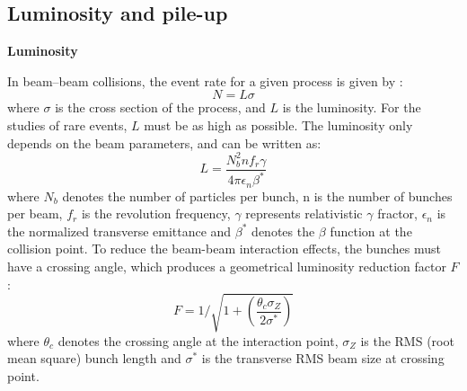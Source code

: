 \subsection{Luminosity and pile-up}

\textbf{Luminosity}

In beam–beam collisions, the event rate for a given process is given by \cite{Evans_2008}:
\begin{equation}
	N = L\sigma
\end{equation}
where $\sigma$ is the cross section of the process, and $L$ is the luminosity.
For the studies of rare events, $L$ must be as high as possible.
The luminosity only depends on the beam parameters, and can be written as:
\begin{equation} \label{eq:lumi}
	L = \frac{ N_{b}^{2} n f_{r} \gamma}{4\pi \epsilon_{n} \beta^{*}}
\end{equation}
where $N_{b}$ denotes the number of particles per bunch, n is the number of bunches per beam,
$f_{r}$ is the revolution frequency, $\gamma$ represents relativistic $\gamma$ fractor, 
$\epsilon_{n}$ is the normalized transverse emittance and $\beta^{*}$ denotes the $\beta$ function at the collision point.
To reduce the beam-beam interaction effects, the bunches must have a crossing angle,
which produces a geometrical luminosity reduction factor $F$:
\begin{equation}
	F = 1 / \sqrt{1 + \left( \frac{\theta_{c}\sigma_{Z}}{2\sigma^{*}} \right) }
\end{equation}
where $\theta_{c}$ denotes the crossing angle at the interaction point, $\sigma_{Z}$ is the RMS (root mean square) bunch length
and $\sigma^{*}$ is the transverse RMS beam size at crossing point.

